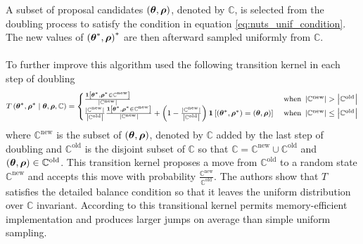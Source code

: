 A subset of proposal candidates $\left (\boldsymbol{\theta}, \boldsymbol{\rho}\right)$, denoted by $\mathbb{C}$, is selected from the doubling process to satisfy the condition in equation \ref{eq:nuts_unif_condition}. The new values of $\left (\boldsymbol{\theta}^*, \boldsymbol{\rho}\right)^*$ are then afterward sampled uniformly from $\mathbb{C}$. 
\\
\\
To further improve this algorithm \cite{hoffman2011nouturn} used the following transition kernel in each step of doubling
\begin{equation*}
\footnotesize
T\left(\boldsymbol{\theta}^{*}, \boldsymbol{\rho}^{*} \mid \boldsymbol{\theta},\boldsymbol{\rho}, \mathbb{C}\right)=\begin{cases} \frac{\mathbf{1}\left[\boldsymbol{\theta}^{*}, \boldsymbol{\rho}^{*} \in \mathbb{C}^{\text{new}}\right]}{\left|\mathbb{C}^{\text{new}}\right|} & \text{  when } \left|\mathbb{C}^{\text{new}}\right|>\left|\mathbb{C}^{\text{old}}\right|\\
\frac{\left|\mathbb{C}^{\text{new}}\right|}{\left|\mathbb{C}^{\text{old}}\right|} \frac{\mathbf{1}\left[\boldsymbol{\theta}^{*}, \boldsymbol{\rho}^{*} \in \mathbb{C}^{\text{new}}\right]}{\left|\mathbb{C}^{\text{new}}\right|}+\left(1-\frac{\left|\mathbb{C}^{\text{new}}\right|}{\left|\mathbb{C}^{\text{old}}\right|}\right) \mathbf{1}\left[\left(\boldsymbol{\theta}^{*}, \boldsymbol{\rho}^{*}\right)=(\boldsymbol{\theta}, \boldsymbol{\rho})\right] 
&\text{  when } \left|\mathbb{C}^{\text{new}}\right|\leq\left|\mathbb{C}^{\text{old}}\right|
\end{cases}
\end{equation*}
where $\mathbb{C}^{\text{new}}$ is the subset of $\left (\boldsymbol{\theta}, \boldsymbol{\rho}\right)$, denoted by $\mathbb{C}$ added by the last step of doubling and $\mathbb{C}^{\text{old}}$ is the disjoint subset of $\mathbb{C}$ so that $\mathbb{C} = \mathbb{C}^{\text{new}} \cup \mathbb{C}^{\text{old}}$ and $\left (\boldsymbol{\theta}, \boldsymbol{\rho}\right) \in \mathbb{C}^{\text{old}}$. This transition kernel proposes a move from $\mathbb{C}^{\text{old}}$ to a random state $\mathbb{C}^{\text{new}}$ and accepts this move with probability $\frac{\mathbb{C}^{\text{new}}}{\mathbb{C}^{\text{old}}}$. The authors show that $T$ satisfies the detailed balance condition so that it leaves the uniform distribution over $\mathbb{C}$ invariant. According to \cite{nishio_arakawa_nouturn} this transitional kernel permits memory-efficient implementation and produces larger jumps on average than simple uniform sampling. 

